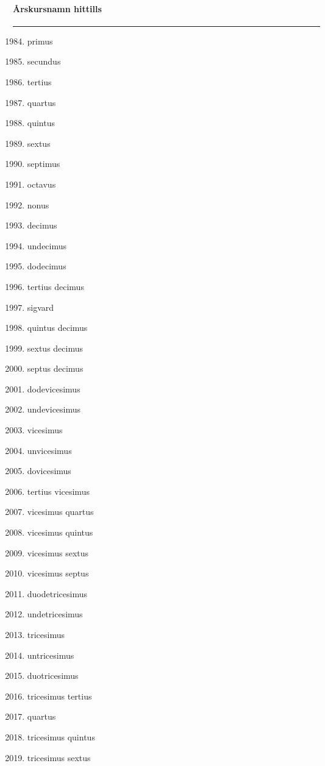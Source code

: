 \begin{song}
\begin{songnotes}
\paragraph{Årskursnamn hittills}
\rule{\textwidth}{0pt}
\begin{multicols}{2}
\begin{enumerate}
\setcounter{enumi}{1983}
\setlength{\itemsep}{0cm}
\setlength{\parskip}{0cm}
\item primus
\item secundus
\item tertius
\item quartus
\item quintus
\item sextus
\item septimus
\item octavus
\item nonus
\item decimus
\item undecimus
\item dodecimus
\item tertius decimus
\item sigvard
\item quintus decimus
\item sextus decimus
\item septus decimus
\item dodevicesimus
\item undevicesimus
\item vicesimus
\item unvicesimus
\item dovicesimus
\item tertius vicesimus
\item vicesimus quartus
\item vicesimus quintus
\item vicesimus sextus
\item vicesimus septus
\item duodetricesimus
\item undetricesimus
\item tricesimus
\item untricesimus
\item duotricesimus
\item tricesimus tertius
\item quartus
\item tricesimus quintus
\item tricesimus sextus
\end{enumerate}
\end{multicols}
\end{songnotes}

\end{song}
